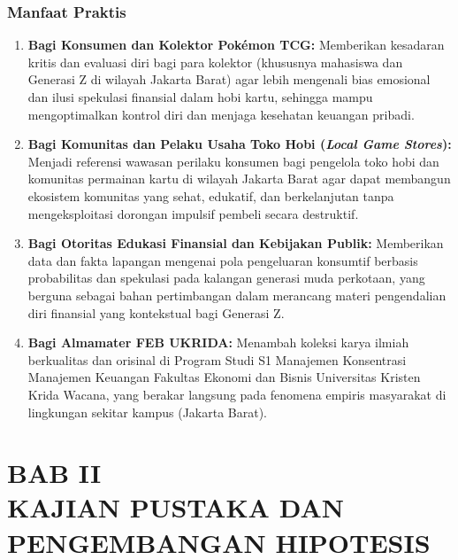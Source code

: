 \documentclass[12pt,a4paper]{article}
\numberwithin{equation}{section}
\numberwithin{table}{section}
\numberwithin{figure}{section}
\begin{document}
\subsubsection{Manfaat Praktis}
\begin{enumerate}
  \item \textbf{Bagi Konsumen dan Kolektor Pok\'emon TCG:} Memberikan kesadaran kritis dan evaluasi diri bagi para kolektor (khususnya mahasiswa dan Generasi Z di wilayah Jakarta Barat) agar lebih mengenali bias emosional dan ilusi spekulasi finansial dalam hobi kartu, sehingga mampu mengoptimalkan kontrol diri dan menjaga kesehatan keuangan pribadi.
  \item \textbf{Bagi Komunitas dan Pelaku Usaha Toko Hobi (\emph{Local Game Stores}):} Menjadi referensi wawasan perilaku konsumen bagi pengelola toko hobi dan komunitas permainan kartu di wilayah Jakarta Barat agar dapat membangun ekosistem komunitas yang sehat, edukatif, dan berkelanjutan tanpa mengeksploitasi dorongan impulsif pembeli secara destruktif.
  \item \textbf{Bagi Otoritas Edukasi Finansial dan Kebijakan Publik:} Memberikan data dan fakta lapangan mengenai pola pengeluaran konsumtif berbasis probabilitas dan spekulasi pada kalangan generasi muda perkotaan, yang berguna sebagai bahan pertimbangan dalam merancang materi pengendalian diri finansial yang kontekstual bagi Generasi Z.
  \item \textbf{Bagi Almamater FEB UKRIDA:} Menambah koleksi karya ilmiah berkualitas dan orisinal di Program Studi S1 Manajemen Konsentrasi Manajemen Keuangan Fakultas Ekonomi dan Bisnis Universitas Kristen Krida Wacana, yang berakar langsung pada fenomena empiris masyarakat di lingkungan sekitar kampus (Jakarta Barat).
\end{enumerate}

\newpage
\setcounter{section}{1}
\section*{BAB II\\[0.3cm]KAJIAN PUSTAKA DAN PENGEMBANGAN HIPOTESIS}
{}
\setcounter{section}{2}
\setcounter{subsection}{0}
\setcounter{table}{0}
\setcounter{figure}{0}
\setcounter{equation}{0}
\end{document}
